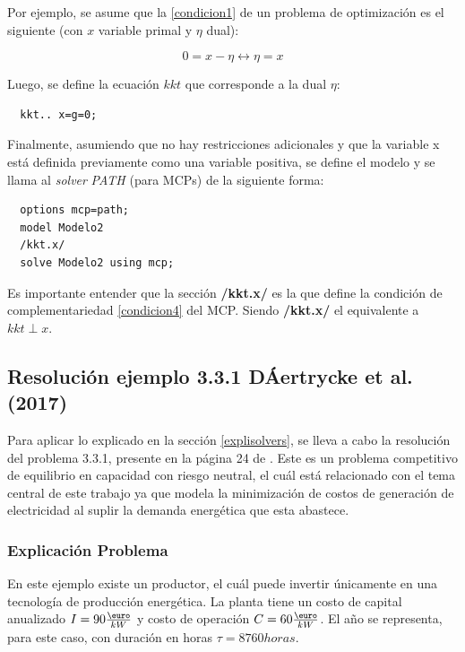 Por ejemplo, se asume que la \ref{condicion1} de un problema de optimización es el siguiente (con $x$ variable primal y $\eta$ dual):

$$0=x-\eta \leftrightarrow \eta=x$$

Luego, se define la ecuación $kkt$ que corresponde a la dual $\eta$:

\begin{lstlisting}
  kkt.. x=g=0;
 \end{lstlisting}

Finalmente, asumiendo que no hay restricciones adicionales y que la variable x está definida previamente como una variable positiva, se define el modelo y se llama al \textit{solver} \textit{PATH} (para MCPs) de la siguiente forma:

\begin{lstlisting}
  options mcp=path;
  model Modelo2
  /kkt.x/
  solve Modelo2 using mcp;
\end{lstlisting}

Es importante entender que la sección \textbf{/kkt.x/} es la que define la condición de complementariedad \ref{condicion4} del MCP. Siendo \textbf{/kkt.x/} el equivalente a  $kkt \perp x$. 

\subsection{Resolución ejemplo 3.3.1 DÁertrycke et al. (2017)}

Para aplicar lo explicado en la sección \ref{explisolvers}, se lleva a cabo la resolución del problema 3.3.1, presente en la página 24 de . Este es un problema competitivo de equilibrio en capacidad con riesgo neutral, el cuál está relacionado con el tema central de este trabajo ya que modela la minimización de costos de generación de electricidad al suplir la demanda energética que esta abastece. 
\vspace{2.5mm}

\subsubsection{Explicación Problema}
En este ejemplo existe un productor, el cuál puede invertir únicamente en una tecnología de producción energética. La planta tiene un costo de capital anualizado $I=90 \frac{\textup{\euro}}{kW}$ y costo de operación $C=60 \frac{\textup{\euro}}{kW}$. El año se representa, para este caso, con duración en horas $\tau = 8760 horas$.
\vspace{2.5mm}

